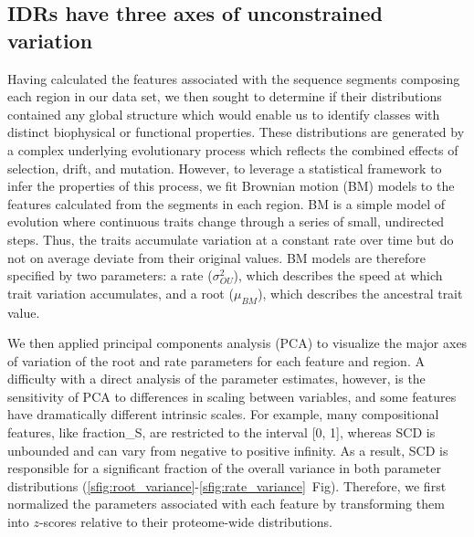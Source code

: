 \subsection{IDRs have three axes of unconstrained variation}
Having calculated the features associated with the sequence segments composing each region in our data set, we then sought to determine if their distributions contained any global structure which would enable us to identify classes with distinct biophysical or functional properties. These distributions are generated by a complex underlying evolutionary process which reflects the combined effects of selection, drift, and mutation. However, to leverage a statistical framework to infer the properties of this process, we fit Brownian motion (BM) models to the features calculated from the segments in each region. BM is a simple model of evolution where continuous traits change through a series of small, undirected steps. Thus, the traits accumulate variation at a constant rate over time but do not on average deviate from their original values. BM models are therefore specified by two parameters: a rate ($\sigma^2_{OU}$), which describes the speed at which trait variation accumulates, and a root ($\mu_{BM}$), which describes the ancestral trait value.

We then applied principal components analysis (PCA) to visualize the major axes of variation of the root and rate parameters for each feature and region. A difficulty with a direct analysis of the parameter estimates, however, is the sensitivity of PCA to differences in scaling between variables, and some features have dramatically different intrinsic scales. For example, many compositional features, like fraction\_S, are restricted to the interval [0, 1], whereas SCD is unbounded and can vary from negative to positive infinity. As a result, SCD is responsible for a significant fraction of the overall variance in both parameter distributions (\ref{sfig:root_variance}-\ref{sfig:rate_variance}~Fig). Therefore, we first normalized the parameters associated with each feature by transforming them into $z$-scores relative to their proteome-wide distributions.

